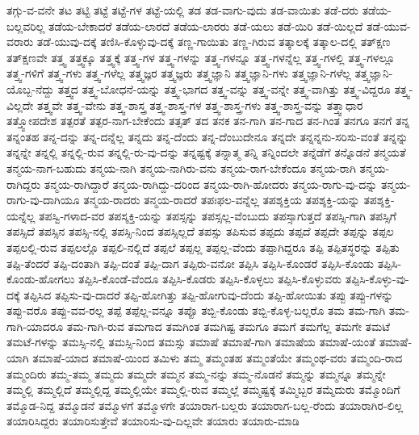 {ತಗ್ಗು-ವ-ವನೇ
ತಟ
ತಟ್ಟಿ
ತಟ್ಟೆ
ತಟ್ಟೆ-ಗಳ
ತಟ್ಟೆ-ಯಲ್ಲಿ
ತಡ
ತಡ-ವಾಗು-ವುದು
ತಡ-ವಾಯಿತು
ತಡೆ-ದರು
ತಡೆಯ-ಬಲ್ಲವರಿಲ್ಲ
ತಡೆಯ-ಬೇಕಾದರೆ
ತಡೆಯ-ಲಾರದೆ
ತಡೆಯ-ಲಾರರು
ತಡೆ-ಯಲು
ತಡೆ-ಯಿರಿ
ತಡೆ-ಯಿಲ್ಲದೆ
ತಡೆ-ಯುವ-ವರಾರು
ತಡೆ-ಯುವು-ದಕ್ಕೆ
ತಣಿಸಿ-ಕೊಳ್ಳುವು-ದಕ್ಕೆ
ತಣ್ಣ-ಗಾಯಿತು
ತಣ್ಣ-ಗಿರುವ
ತತ್ಕಾಲಕ್ಕೆ
ತತ್ಕಾಲ-ದಲ್ಲಿ
ತತ್ಕ್ಷಣ
ತತ್ಕ್ಷಣವೇ
ತತ್ತ್ವ
ತತ್ತ್ವಕ್ಕೂ
ತತ್ತ್ವಕ್ಕೆ
ತತ್ತ್ವ-ಗಳ
ತತ್ತ್ವ-ಗಳನ್ನು
ತತ್ತ್ವ-ಗಳನ್ನೂ
ತತ್ತ್ವ-ಗಳನ್ನೆಲ್ಲ
ತತ್ತ್ವ-ಗಳಲ್ಲಿ
ತತ್ತ್ವ-ಗಳಲ್ಲೂ
ತತ್ತ್ವ-ಗಳಿಗೆ
ತತ್ತ್ವ-ಗಳು
ತತ್ತ್ವ-ಗಳೆಲ್ಲ
ತತ್ತ್ವಜ್ಞರ
ತತ್ತ್ವಜ್ಞರು
ತತ್ತ್ವಜ್ಞಾನಿ
ತತ್ತ್ವಜ್ಞಾನಿ-ಗಳು
ತತ್ತ್ವಜ್ಞಾನಿ-ಗಳೆಲ್ಲ
ತತ್ತ್ವಜ್ಞಾನಿ-ಯೊಬ್ಬ-ನೆದ್ದು
ತತ್ತ್ವದ
ತತ್ತ್ವ-ಬೋಧನೆ-ಯನ್ನು
ತತ್ತ್ವ-ಭಾಗದ
ತತ್ತ್ವ-ವನ್ನು
ತತ್ತ್ವ-ವನ್ನೇ
ತತ್ತ್ವ-ವಾಗಿತ್ತು
ತತ್ತ್ವ-ವಿದ್ದರೂ
ತತ್ತ್ವ-ವಿಲ್ಲದೇ
ತತ್ತ್ವವೇ
ತತ್ತ್ವ-ವೇನು
ತತ್ತ್ವ-ಶಾಸ್ತ್ರ
ತತ್ತ್ವ-ಶಾಸ್ತ್ರ-ಗಳ
ತತ್ತ್ವ-ಶಾಸ್ತ್ರ-ಗಳು
ತತ್ತ್ವ-ಶಾಸ್ತ್ರ-ವನ್ನು
ತತ್ತ್ವಾಧಾರ
ತತ್ತ್ವೋಪದೇಶ
ತತ್ಪರತೆ
ತತ್ಪರ-ನಾಗ-ಬೇಕೆಂದು
ತತ್ಸತ್
ತದ
ತನಕ
ತನ-ಗಾಗಿ
ತನ-ಗಾದ
ತನ-ಗಿಂತ
ತನಗೂ
ತನಗೆ
ತನ್ನ
ತನ್ನಂತಹ
ತನ್ನ-ದನ್ನು
ತನ್ನ-ದನ್ನೆಲ್ಲ
ತನ್ನದು
ತನ್ನ-ದೆಂದು
ತನ್ನ-ದೆಂಬುದೇನೂ
ತನ್ನದೇ
ತನ್ನನ್ನನು-ಸರಿಸು-ವಂತೆ
ತನ್ನನ್ನು
ತನ್ನನ್ನೇ
ತನ್ನಲ್ಲಿ
ತನ್ನಲ್ಲಿ-ರುವ
ತನ್ನಲ್ಲಿ-ರು-ವು-ದನ್ನು
ತನ್ನಷ್ಟಕ್ಕೆ
ತನ್ನಾತ್ಮ
ತನ್ನಿ
ತನ್ನಿಂದಲೇ
ತನ್ನೆಡೆಗೆ
ತನ್ನೊಡನೆ
ತನ್ಮಯತೆ
ತನ್ಮಯ-ನಾಗ-ಬಹುದು
ತನ್ಮಯ-ನಾಗಿ
ತನ್ಮಯ-ನಾಗಿರು-ವನು
ತನ್ಮಯ-ರಾಗ-ಬೇಕೆಂದೂ
ತನ್ಮಯ-ರಾಗಿ
ತನ್ಮಯ-ರಾಗಿದ್ದರು
ತನ್ಮಯ-ರಾಗಿದ್ದಾರೆ
ತನ್ಮಯ-ರಾಗಿದ್ದು-ದರಿಂದ
ತನ್ಮಯ-ರಾಗಿ-ಹೋದರು
ತನ್ಮಯ-ರಾಗು-ವು-ದನ್ನು
ತನ್ಮಯ-ರಾಗು-ವು-ದಾಗಿಯೂ
ತನ್ಮಯ-ರಾದರು
ತನ್ಮಯ-ರಾದರೆ
ತಪಃಫಲ-ವನ್ನೆಲ್ಲ
ತಪಶ್ಶಕ್ತಿಯ
ತಪಶ್ಶಕ್ತಿ-ಯನ್ನು
ತಪಶ್ಶಕ್ತಿ-ಯನ್ನೆಲ್ಲ
ತಪಸ್ವಿ-ಗಳಾದ-ವರ
ತಪಸ್ಶಕ್ತಿ-ಯನ್ನು
ತಪಸ್ಸನ್ನು
ತಪಸ್ಸಲ್ಲ-ವೆಂಬುದು
ತಪಸ್ಸಾಗುತ್ತದೆ
ತಪಸ್ಸಿ-ಗಾಗಿ
ತಪಸ್ಸಿಗೆ
ತಪಸ್ಸಿದೆ
ತಪಸ್ಸಿನ
ತಪಸ್ಸಿ-ನಲ್ಲಿ
ತಪಸ್ಸಿ-ನಿಂದ
ತಪಸ್ಸಿಲ್ಲದೆ
ತಪಸ್ಸು
ತಪಿಸುವ
ತಪ್ಪದು
ತಪ್ಪದೆ
ತಪ್ಪದೇ
ತಪ್ಪನ್ನು
ತಪ್ಪಲ
ತಪ್ಪಲಲ್ಲಿ-ರುವ
ತಪ್ಪಲಲ್ಲೊ
ತಪ್ಪಲಿ-ನಲ್ಲಿದೆ
ತಪ್ಪಲೆ
ತಪ್ಪಲ್ಲ
ತಪ್ಪಲ್ಲ-ವೆಂದು
ತಪ್ಪಾಗಿದ್ದರೂ
ತಪ್ಪಿ
ತಪ್ಪಿತಸ್ಥರನ್ನು
ತಪ್ಪಿತು
ತಪ್ಪಿ-ತೆಂದರೆ
ತಪ್ಪಿ-ದಂತಾಗಿ
ತಪ್ಪಿ-ದಂತೆ
ತಪ್ಪಿ-ದಾಗ
ತಪ್ಪಿರು-ವನೋ
ತಪ್ಪಿಸಿ
ತಪ್ಪಿಸಿ-ಕೊಂಡರೆ
ತಪ್ಪಿಸಿ-ಕೊಂಡು
ತಪ್ಪಿಸಿ-ಕೊಂಡು-ಹೋಗಲು
ತಪ್ಪಿಸಿ-ಕೊಂಡೆ-ವೆಂದೂ
ತಪ್ಪಿಸಿ-ಕೊಡರು
ತಪ್ಪಿಸಿ-ಕೊಳ್ಳಲು
ತಪ್ಪಿಸಿ-ಕೊಳ್ಳುವರು
ತಪ್ಪಿಸಿ-ಕೊಳ್ಳು-ವು-ದಕ್ಕೆ
ತಪ್ಪಿಸಿದ
ತಪ್ಪಿಸು-ವು-ದಾದರೆ
ತಪ್ಪಿ-ಹೋಗಿತ್ತು
ತಪ್ಪಿ-ಹೋಗುವು-ದೆಂದು
ತಪ್ಪಿ-ಹೋಯಿತು
ತಪ್ಪು
ತಪ್ಪು-ಗಳನ್ನು
ತಪ್ಪು-ವರೊ
ತಪ್ಪು-ವವ-ರಲ್ಲ
ತಪ್ಪೆ
ತಪ್ಪೆಲ್ಲ-ವನ್ನೂ
ತಪ್ಪೊ
ತಬ್ಬಿ-ಕೊಂಡು
ತಬ್ಬಿ-ಕೊಳ್ಳ-ಬಲ್ಲರೊ
ತಮ
ತಮ-ಗಾಗಿ
ತಮ-ಗಾಗಿ-ಯಾದರೂ
ತಮ-ಗಾಗಿ-ರುವ
ತಮಗಾದ
ತಮಗಿಂತ
ತಮಗಿಷ್ಟ
ತಮಗೂ
ತಮಗೆ
ತಮಗೆಲ್ಲ
ತಮಗೇ
ತಮಟೆ
ತಮಟೆ-ಗಳನ್ನು
ತಮಸ್ಸಿ-ನಲ್ಲಿ
ತಮಸ್ಸಿ-ನಿಂದ
ತಮಸ್ಸು
ತಮಾಷೆ
ತಮಾಷೆ-ಗಾಗಿ
ತಮಾಷೆಯ
ತಮಾಷೆ-ಯಂತೆ
ತಮಾಷೆ-ಯಾಗಿ
ತಮಾಷೆ-ಯಾದ
ತಮಾಷೆ-ಯಿಂದ
ತಮಿಳು
ತಮ್ಮ
ತಮ್ಮಂತಹ
ತಮ್ಮಂತೆಯೇ
ತಮ್ಮಂಥ-ವರು
ತಮ್ಮಂದಿ-ರಾದ
ತಮ್ಮಂದಿರು
ತಮ್ಮ-ತಮ್ಮ
ತಮ್ಮದು
ತಮ್ಮದೇ
ತಮ್ಮನ
ತಮ್ಮ-ನನ್ನು
ತಮ್ಮ-ನೊಡನೆ
ತಮ್ಮನ್ನು
ತಮ್ಮನ್ನೂ
ತಮ್ಮನ್ನೇ
ತಮ್ಮಲ್ಲಿ
ತಮ್ಮಲ್ಲಿದೆ
ತಮ್ಮಲ್ಲಿದ್ದ
ತಮ್ಮಲ್ಲಿಯೇ
ತಮ್ಮಲ್ಲಿ-ರುವ
ತಮ್ಮಲ್ಲೆ
ತಮ್ಮಷ್ಟಕ್ಕೆ
ತಮ್ಮಿಬ್ಬರ
ತಮ್ಮೆದುರು
ತಮ್ಮೊಂದಿಗೆ
ತಮ್ಮೊಡ-ನಿದ್ದ
ತಮ್ಮೊಡನೆ
ತಮ್ಮೊಳಗೆ
ತಮ್ಮೊಳಗೇ
ತಯಾರಾಗ-ಬಲ್ಲರು
ತಯಾರಾಗ-ಬಲ್ಲ-ರೆಂದು
ತಯಾರಾಗಿರ-ಲಿಲ್ಲ
ತಯಾರಿಸಿದ್ದರು
ತಯಾರಿಸುತ್ತೇವೆ
ತಯಾರಿಸು-ವು-ದಿಲ್ಲವೇ
ತಯಾರು
ತಯಾರು-ಮಾಡಿ
}
